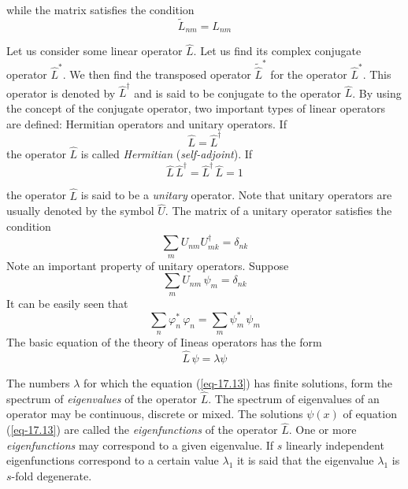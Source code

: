 \documentclass[a4paper,sfsidenotes,colorlinks=true]{tufte-book}
\numberwithin{equation}{section}
\numberwithin{figure}{section}
\begin{document}
while the matrix satisfies the condition 
\begin{equation}%
\tilde{L}_{nm} = L_{nm}
\label{eq-17.8} 
\end{equation}

Let us consider some linear operator $\hat{L}$. Let us find its
complex conjugate operator $\hat{L}^{*}$. We then find the transposed
operator $\widetilde{\hat{L}}^{*}$ for the operator
$\hat{L}^{*}$. This operator is denoted by
$\hat{L}^{\dagger}$ and is
said to be conjugate to the operator  $\hat{L}$.  By using the concept of the
conjugate operator, two important types of linear operators are
defined: Hermitian operators and unitary operators. If
\begin{equation}%
\hat{L} = \hat{L}^{\dagger}
\label{eq-17.9} 
\end{equation}
the operator $\hat{L}$ is called \emph{Hermitian} (\emph{self-adjoint}). If 
\begin{equation}%
\hat{L} \, \hat{L}^{\dagger} = \hat{L}^{\dagger} \, \hat{L} =1 
\label{eq-17.10} 
\end{equation}

the operator $\hat{L}$ is said to be a \emph{unitary} operator. Note that
unitary operators are usually denoted by the symbol $\hat{U}$. The
matrix of a unitary operator satisfies the condition
\begin{equation}%
\sum_{m} U_{nm} U^{\dagger}_{mk} = \delta_{nk}
\label{eq-17.11} 
\end{equation}
Note an important property of unitary operators. Suppose 
\begin{equation*}
\sum_{m} U_{nm} \, \psi_{m} = \delta_{nk}
\end{equation*}
It can be easily seen that 
\begin{equation}%
\sum_{n} \varphi_{n}^{*} \, \varphi_{n} = \sum_{m} \psi_{m}^{*} \, \psi_{m}
\label{eq-17.12} 
\end{equation}
The basic equation of the theory of Iineas operators has the form
\begin{equation}%
\hat{L} \, \psi = \lambda  \psi
\label{eq-17.13} 
\end{equation}

The numbers $\lambda$ for which the equation (\ref{eq-17.13}) has
finite solutions, form the spectrum of \emph{eigenvalues} of the
operator $\hat{L}$. The spectrum of eigenvalues of an operator may be
continuous, discrete or mixed. The solutions $\psi (x)$ of equation
(\ref{eq-17.13}) are called the \emph{eigenfunctions} of the operator
$\hat{L}$. One or more \emph{eigenfunctions} may correspond to a given
eigenvalue. If $s$ linearly independent eigenfunctions correspond to a
certain value $\lambda_{1}$ it is said that the eigenvalue
$\lambda_{1}$ is $s$-fold degenerate.
\end{document}
